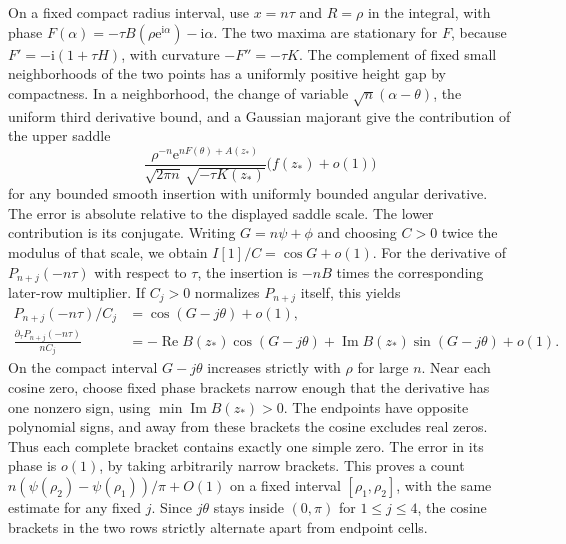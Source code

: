\documentclass[11pt]{article}
\DeclareMathOperator{\Rea}{Re}
\DeclareMathOperator{\Ima}{Im}
\newcommand{\ee}{\mathrm e}
\newcommand{\ii}{\mathrm i}
\begin{document}
On a fixed compact radius interval, use \(x=n\tau\) and \(R=\rho\) in the integral, with phase \(F(\alpha)=-\tau B(\rho\ee^{\ii\alpha})-\ii\alpha\). The two maxima are stationary for \(F\), because \(F'=-\ii(1+\tau H)\), with curvature \(-F''=-\tau K\). The complement of fixed small neighborhoods of the two points has a uniformly positive height gap by compactness. In a neighborhood, the change of variable \(\sqrt n(\alpha-\theta)\), the uniform third derivative bound, and a Gaussian majorant give the contribution of the upper saddle
\[
 \frac{\rho^{-n}\ee^{nF(\theta)+A(z_*)}}
 {\sqrt{2\pi n}\,\sqrt{-\tau K(z_*)}}\bigl(f(z_*)+o(1)\bigr)
\]
for any bounded smooth insertion with uniformly bounded angular derivative. The error is absolute relative to the displayed saddle scale. The lower contribution is its conjugate. Writing \(G=n\psi+\phi\) and choosing \(C>0\) twice the modulus of that scale, we obtain \(I[1]/C=\cos G+o(1)\). For the derivative of \(P_{n+j}(-n\tau)\) with respect to \(\tau\), the insertion is \(-nB\) times the corresponding later-row multiplier. If \(C_j>0\) normalizes \(P_{n+j}\) itself, this yields
\begin{align*}
 P_{n+j}(-n\tau)/C_j&=\cos(G-j\theta)+o(1),\\
 \frac{\partial_\tau P_{n+j}(-n\tau)}{n C_j}
 &=-\Rea B(z_*)\cos(G-j\theta)+\Ima B(z_*)\sin(G-j\theta)+o(1).
\end{align*}
On the compact interval \(G-j\theta\) increases strictly with \(\rho\) for large \(n\). Near each cosine zero, choose fixed phase brackets narrow enough that the derivative has one nonzero sign, using \(\min\Ima B(z_*)>0\). The endpoints have opposite polynomial signs, and away from these brackets the cosine excludes real zeros. Thus each complete bracket contains exactly one simple zero. The error in its phase is \(o(1)\), by taking arbitrarily narrow brackets. This proves a count \(n(\psi(\rho_2)-\psi(\rho_1))/\pi+O(1)\) on a fixed interval \([\rho_1,\rho_2]\), with the same estimate for any fixed \(j\). Since \(j\theta\) stays inside \((0,\pi)\) for \(1\le j\le4\), the cosine brackets in the two rows strictly alternate apart from endpoint cells.
\end{document}
